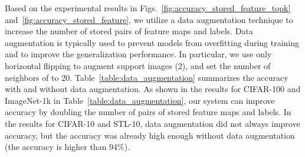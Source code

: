 \documentclass[runningheads]{llncs}
\begin{document}
\begin{table}[t]
\caption{Accuracy comparison with and without data augmentation (DA) on the support sets.}
\label{table:data_augmentation}
\end{table}


Based on the experimental results in Figs.~\ref{fig:accuracy_stored_feature_topk} and~\ref{fig:accuracy_stored_feature},
we utilize a data augmentation technique to increase the number of stored pairs of feature maps and labels.
Data augmentation is typically used to prevent models from overfitting during training and to improve the generalization performance.
In particular, we use only horizontal flipping to augment support images (2), and set the number of neighbors of  to 20.
Table~\ref{table:data_augmentation} summarizes the accuracy with and without data augmentation.
As shown in the results for CIFAR-100 and ImageNet-1k in Table~\ref{table:data_augmentation},
our system can improve accuracy by doubling the number of pairs of stored feature maps and labels. 
In the results for CIFAR-10 and STL-10, data augmentation did not always improve accuracy, but the accuracy was already high enough without data augmentation (the accuracy is higher than 94\%).
\end{document}
